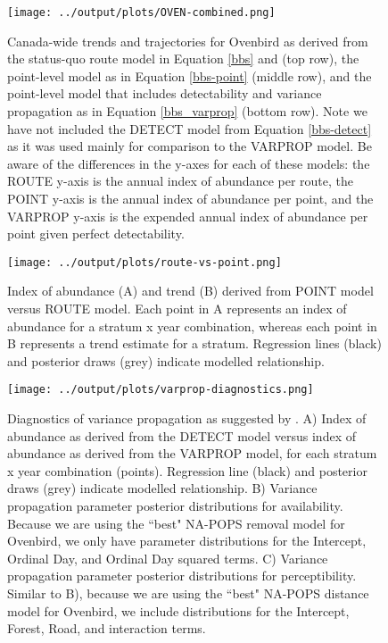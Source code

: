 \documentclass[12pt]{article}
\begin{document}
\begin{figure}[h!]
	\texttt{[image: ../output/plots/OVEN-combined.png]}
	\caption{Canada-wide trends and trajectories for Ovenbird as derived from the status-quo route model in Equation \ref{bbs} and \citet{smith_spatially_2023} (top row), the point-level model as in Equation \ref{bbs-point} (middle row), and the point-level model that includes detectability and variance propagation as in Equation \ref{bbs_varprop} (bottom row). Note we have not included the DETECT model from Equation \ref{bbs-detect} as it was used mainly for comparison to the VARPROP model. Be aware of the differences in the y-axes for each of these models: the ROUTE y-axis is the annual index of abundance per route, the POINT y-axis is the annual index of abundance per point, and the VARPROP y-axis is the expended annual index of abundance per point given perfect detectability.}
	\label{fig:oven-combined}
\end{figure}

\begin{figure}[h]
	\texttt{[image: ../output/plots/route-vs-point.png]}
	\caption{Index of abundance (A) and trend (B) derived from POINT model versus ROUTE model. Each point in A represents an index of abundance for a stratum x year combination, whereas each point in B represents a trend estimate for a stratum. Regression lines (black) and posterior draws (grey) indicate modelled relationship.}
	\label{fig:route-vs-point}
\end{figure}

\begin{figure}[h]
	\texttt{[image: ../output/plots/varprop-diagnostics.png]}
	\caption{Diagnostics of variance propagation as suggested by \citet{bravington_variance_2021}. A) Index of abundance as derived from the DETECT model versus index of abundance as derived from the VARPROP model, for each stratum x year combination (points). Regression line (black) and posterior draws (grey) indicate modelled relationship. B) Variance propagation parameter posterior distributions for availability. Because we are using the ``best" NA-POPS removal model for Ovenbird, we only have parameter distributions for the Intercept, Ordinal Day, and Ordinal Day squared terms. C) Variance propagation parameter posterior distributions for perceptibility. Similar to B), because we are using the ``best" NA-POPS distance model for Ovenbird, we include distributions for the Intercept, Forest, Road, and interaction terms.}
	\label{fig:varprop-diagnostics}
\end{figure}
\end{document}
